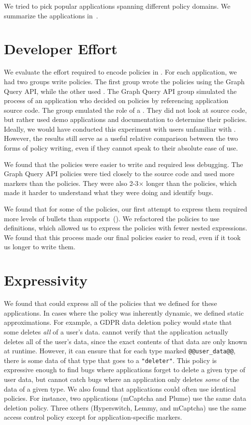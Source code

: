 We tried to pick popular applications spanning different policy domains.
%
We summarize the applications in~.

\section{Developer Effort}
\label{sec:accessibility}
%
We evaluate the effort required to encode policies in \syslang{}.
%
For each application, we had two groups write policies.
%
The first group wrote the policies using the Graph Query API, while the other used \syslang{}.
%
The Graph Query API group simulated the process of an application \dev{} who decided on policies by referencing application source code.
%
The \syslang{} group emulated the role of a \ce{}.
%
They did not look at source code, but rather used demo applications and documentation to determine their policies.
%
Ideally, we would have conducted this experiment with users unfamiliar with \sys{}.
%
However, the results still serve as a useful relative comparison between the two forms of policy writing,
even if they cannot speak to their absolute ease of use.

We found that the \syslang{} policies were easier to write and required less debugging.
%
The Graph Query API policies were tied closely to the source code and used more markers than the \syslang{} policies.
%
They were also 2-3$\times$ longer than the \syslang{} policies, 
which made it harder to understand what they were doing and identify bugs.

We found that for some of the policies, 
our first attempt to express them required more levels of bullets than \sys{} supports~().
%
We refactored the policies to use definitions, 
which allowed us to express the policies with fewer nested expressions.
%
We found that this process made our final policies easier to read,
even if it took us longer to write them.
%

\section{Expressivity}
\label{sec:expressivity}
%
We found that \syslang{} could express all of the policies that we defined for these applications.
%
In cases where the policy was inherently dynamic, we defined static approximations.
%
For example, a GDPR data deletion policy would state that some \controller{} deletes \emph{all} of a user's data.
%
\sys{} cannot verify that the application actually deletes all of the user's data,
since the exact contents of that data are only known at runtime.
%
However, it can ensure that for each type marked \lstinline[language=CNL]|@@user_data@@|, 
there is some data of that type that goes to a \lstinline[language=CNL]|"deleter"|.
%
This policy is expressive enough to find bugs where applications forget to delete a given type of user data,
but cannot catch bugs where an application only deletes \emph{some} of the data of a given type.
%
We also found that applications could often use identical policies.
%
For instance, two applications (mCaptcha and Plume) use the same data deletion policy.
%
Three others (Hyperswitch, Lemmy, and mCaptcha) use the same access control policy
except for application-specific markers.
%

